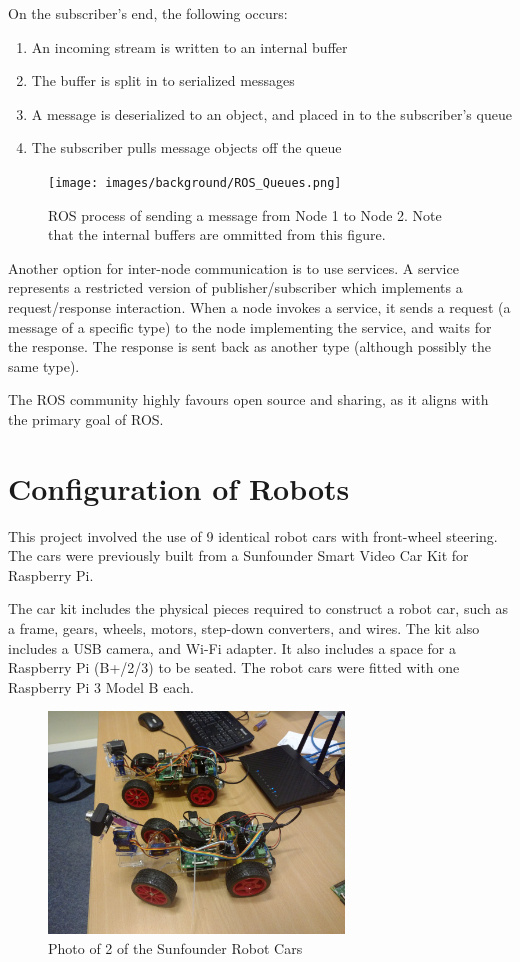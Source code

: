 \documentclass[../dissertation.tex]{subfiles}
\begin{document}
On the subscriber's end, the following occurs:

\begin{enumerate}
  \item An incoming stream is written to an internal buffer
  \item The buffer is split in to serialized messages
  \item A message is deserialized to an object, and placed in to the subscriber's queue
  \item The subscriber pulls message objects off the queue
\end{enumerate}

\begin{figure}[H]
\centering
\texttt{[image: images/background/ROS\_Queues.png]}
\caption{ROS process of sending a message from Node 1 to Node 2. Note that the internal buffers are ommitted from this figure.}
\end{figure}

Another option for inter-node communication is to use services. A service represents a restricted version of publisher/subscriber which implements a request/response interaction. When a node invokes a service, it sends a request (a message of a specific type) to the node implementing the service, and waits for the response. The response is sent back as another type (although possibly the same type).

The ROS community highly favours open source and sharing, as it aligns with the primary goal of ROS.

\section{Configuration of Robots}
\label{background-robot-config}

This project involved the use of 9 identical robot cars with front-wheel steering. The cars were previously built from a Sunfounder Smart Video Car Kit for Raspberry Pi\cite{SunfounderRobotCarKit}.

The car kit includes the physical pieces required to construct a robot car, such as a frame, gears, wheels, motors, step-down converters, and wires. The kit also includes a USB camera, and Wi-Fi adapter. It also includes a space for a Raspberry Pi (B+/2/3) to be seated. The robot cars were fitted with one Raspberry Pi 3 Model B each.

\begin{figure}[H]
\centering
\includegraphics[width=0.7\textwidth]{images/background/robot-cars.jpg}
\caption{Photo of 2 of the Sunfounder Robot Cars}
\end{figure}
\end{document}

